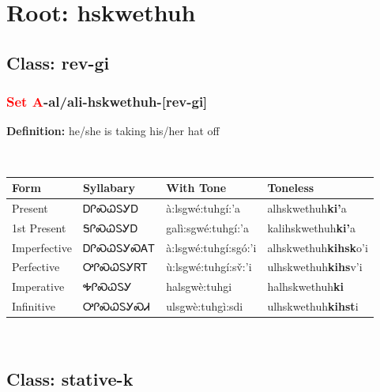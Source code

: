 \needspace{4in}
\section*{Root: hskwethuh}
\nopagebreak
{}
\needspace{3in}
\subsection*{Class: rev-gi}
\nopagebreak
\needspace{2in}
\subsubsection*{\textcolor{Red}{Set A}{-}al/ali{-}\textbf{hskwethuh}{-}[rev-gi]}
\nopagebreak
\textbf{Definition: } he/she is taking his/her hat off
\\[0.5em]
\begin{tabularx}{\textwidth}{l X X X}%
\toprule%
\textbf{Form}&\textbf{Syllabary}&\textbf{With Tone}&\textbf{Toneless}\\%
\midrule%
Present&ᎠᎵᏍᏇᏚᎩᎠ&à:lsgwé:tuhgí:’a&alhskwethuh\textbf{ki'}a\\%
1st Present&ᎦᎵᏍᏇᏚᎩᎠ&galì:sgwé:tuhgí:’a&kalihskwethuh\textbf{ki'}a\\%
Imperfective&ᎠᎵᏍᏇᏚᎩᏍᎪᎢ&à:lsgwé:tuhgí:sgó:’i&alhskwethuh\textbf{kihsk}o'i\\%
Perfective&ᎤᎵᏍᏇᏚᎩᏒᎢ&ù:lsgwé:tuhgí:sv̌:’i&ulhskwethuh\textbf{kihs}v'i\\%
Imperative&ᎭᎵᏍᏇᏚᎩ&halsgwè:tuhgi&halhskwethuh\textbf{ki}\\%
Infinitive&ᎤᎵᏍᏇᏚᎩᏍᏗ&ulsgwè:tuhgì:sdi&ulhskwethuh\textbf{kihst}i\\%
\bottomrule%
\end{tabularx}
\\[1em]
\needspace{3in}
\subsection*{Class: stative-k}
\nopagebreak
\needspace{2in}
